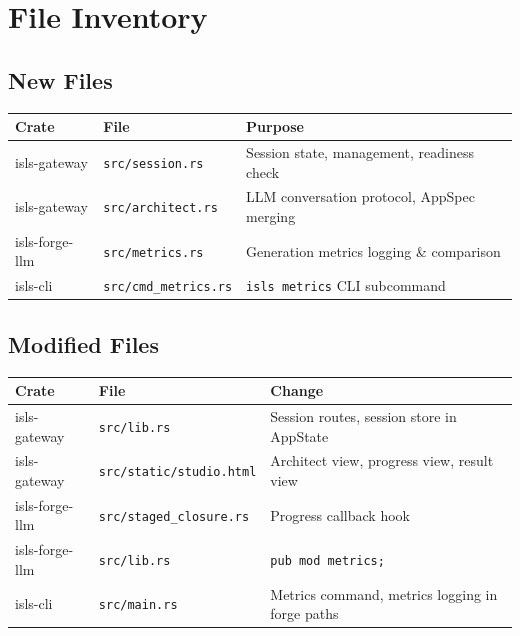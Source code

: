 \documentclass[11pt,a4paper]{article}
\begin{document}
\section{File Inventory}

\subsection{New Files}

\begin{longtable}{llp{7cm}}
\toprule
\textbf{Crate} & \textbf{File} & \textbf{Purpose} \\
\midrule
isls-gateway & \texttt{src/session.rs}
  & Session state, management, readiness check \\
isls-gateway & \texttt{src/architect.rs}
  & LLM conversation protocol, AppSpec merging \\
isls-forge-llm & \texttt{src/metrics.rs}
  & Generation metrics logging \& comparison \\
isls-cli & \texttt{src/cmd\_metrics.rs}
  & \texttt{isls metrics} CLI subcommand \\
\bottomrule
\end{longtable}

\subsection{Modified Files}

\begin{longtable}{llp{7cm}}
\toprule
\textbf{Crate} & \textbf{File} & \textbf{Change} \\
\midrule
isls-gateway & \texttt{src/lib.rs}
  & Session routes, session store in AppState \\
isls-gateway & \texttt{src/static/studio.html}
  & Architect view, progress view, result view \\
isls-forge-llm & \texttt{src/staged\_closure.rs}
  & Progress callback hook \\
isls-forge-llm & \texttt{src/lib.rs}
  & \texttt{pub mod metrics;} \\
isls-cli & \texttt{src/main.rs}
  & Metrics command, metrics logging in forge paths \\
\bottomrule
\end{longtable}


\end{document}
